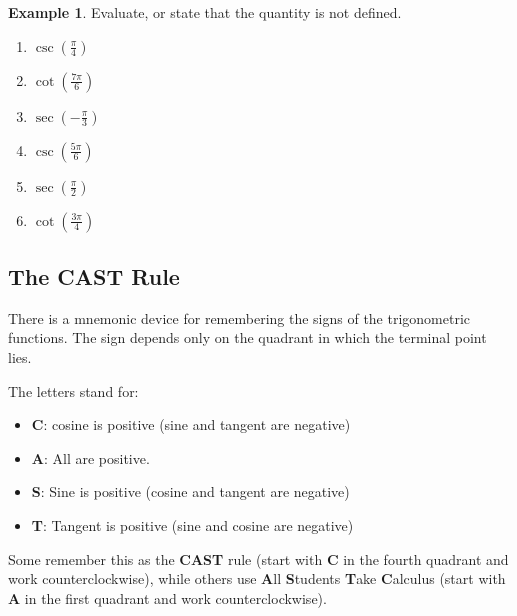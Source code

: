 \documentclass[letterpaper,12pt,oneside]{book}
\theoremstyle{definition}
\newtheorem{example}[theorem]{Example}
\begin{document}
{\begin{example}
Evaluate, or state that the quantity is not defined.
\begin{multicols}{3}
\begin{enumerate}
\item $\csc\left(\tfrac{\pi}{4}\right)$
\vspace{1cm}
\item $\cot\left(\tfrac{7\pi}{6}\right)$
\vspace{1cm}
\item $\sec\left(-\tfrac{\pi}{3}\right)$
\vspace{1cm}
\item $\csc\left(\tfrac{5\pi}{6}\right)$
\vspace{1cm}
\item $\sec\left(\tfrac{\pi}{2}\right)$
\vspace{1cm}
\item $\cot\left(\tfrac{3\pi}{4}\right)$
\vspace{1cm}
\end{enumerate}
\end{multicols}
\vfill
\end{example}

\subsection*{The CAST Rule}

There is a mnemonic device for remembering the signs of the trigonometric functions.  The sign depends only on the quadrant in which the terminal point lies.
\begin{center}
\end{center}
The letters stand for:
\begin{itemize}
\item \textbf{C}: cosine is positive (sine and tangent are negative)
\item \textbf{A}: All are positive.
\item \textbf{S}: Sine is positive (cosine and tangent are negative)
\item \textbf{T}: Tangent is positive (sine and cosine are negative)
\end{itemize}
\noindent
Some remember this as the \textbf{CAST} rule (start with \textbf{C} in the fourth quadrant and work counterclockwise), while others use \textbf{A}ll \textbf{S}tudents \textbf{T}ake \textbf{C}alculus (start with \textbf{A} in the first quadrant and work counterclockwise).

}
\end{document}
